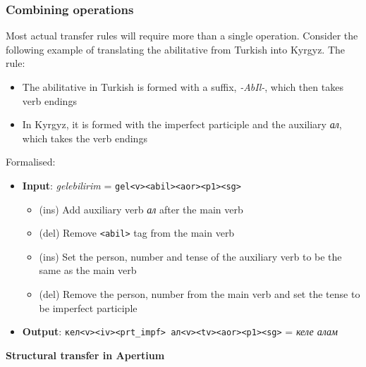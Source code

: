 \documentclass[10pt,xetex]{beamer} %
\begin{document}
\begin{frame}
  \frametitle{Combining operations} %

Most actual transfer rules will require more than a single operation.  Consider the following example of translating the abilitative from Turkish into Kyrgyz. The rule:

\begin{itemize}
  \item The abilitative in Turkish is formed with a suffix, {\em -AbIl-}, which then takes verb endings
  \item In Kyrgyz, it is formed with the imperfect participle and the auxiliary {\em ал}, which takes the verb endings
\end{itemize}

Formalised:

\begin{itemize}
  \item {\bf Input}: {\em gelebilirim} = {\tt gel<v><abil><aor><p1><sg>} %
  \begin{itemize}
    \item ({\sc ins}) Add auxiliary verb {\em ал} after the main verb
    \item ({\sc del}) Remove {\tt <abil>} tag from the main verb
    \item ({\sc ins}) Set the person, number and tense of the auxiliary verb to be the same as the main verb
    \item ({\sc del}) Remove the person, number from the main verb and set the tense to be imperfect participle
  \end{itemize}
  \item {\bf Output}: {\tt кел<v><iv>\alert<4>{<prt\_{}impf>} \alert<1>{ал<v><tv>\alert<3>{<aor><p1><sg>}}} = {\em келе алам} %
\end{itemize}


\end{frame}

%
%
%
%



\begin{frame} %
 \begin{center}
 {\Large {\bf Structural transfer in Apertium}} 
 \end{center}
\end{frame}
\end{document}
